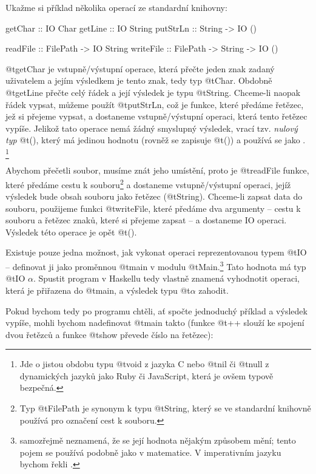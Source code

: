 Ukažme si příklad několika operací ze standardní knihovny:

\begin{haskell}
getChar :: IO Char
getLine :: IO String
putStrLn :: String -> IO ()

readFile :: FilePath -> IO String
writeFile :: FilePath -> String -> IO ()
\end{haskell}

@t{getChar} je vstupně/výstupní operace, která přečte jeden znak zadaný
uživatelem a jejím výsledkem je tento znak, tedy typ @t{Char}. Obdobně
@t{getLine} přečte celý řádek a její výsledek je typu @t{String}. Chceme-li
naopak řádek vypsat, můžeme použít @t{putStrLn}, což je funkce, které předáme
řetězec, jež si přejeme vypsat, a dostaneme vstupně/výstupní operaci, která
tento řetězec vypíše. Jelikož tato operace nemá žádný smyslupný výsledek, vrací
tzv. \emph{nulový typ} @t{()}, který má jedinou hodnotu (rovněž se zapisuje
@t{()}) a používá se jako . \footnote{Jde o jistou obdobu typu @t{void} z
jazyka C nebo @t{nil} či @t{null} z dynamických jazyků jako Ruby či JavaScript,
která je ovšem typově bezpečná.}

Abychom přečetli soubor, musíme znát jeho umístění, proto je @t{readFile}
funkce, které předáme cestu k souboru\footnote{Typ @t{FilePath} je synonym k
  typu @t{String}, který se ve standardní knihovně používá pro označení cest k
souboru.} a dostaneme vstupně/výstupní operaci, jejíž výsledek bude obsah
souboru jako řetězec (@t{String}). Chceme-li zapsat data do souboru, použijeme
funkci @t{writeFile}, které předáme dva argumenty -- cestu k souboru a řetězec
znaků, které si přejeme zapsat -- a dostaneme IO operaci. Výsledek této operace
je opět @t{()}.

Existuje pouze jedna možnost, jak vykonat operaci reprezentovanou typem @t{IO}
-- definovat ji jako proměnnou @t{main} v modulu
@t{Main}.\footnote{ samozřejmě neznamená, že se její hodnota
  nějakým způsobem mění; tento pojem se používá podobně jako v matematice. V
imperativním jazyku bychom řekli .} Tato hodnota má typ @t{IO
$\alpha$}. Spustit program v Haskellu tedy vlastně znamená vyhodnotit operaci,
která je přiřazena do @t{main}, a výsledek typu @t{$\alpha$} zahodit.

Pokud bychom tedy po programu chtěli, ať spočte jednoduchý příklad a výsledek
vypíše, mohli bychom nadefinovat @t{main} takto (funkce @t{++} slouží ke spojení
dvou řetězců a funkce @t{show} převede číslo na řetězec):

